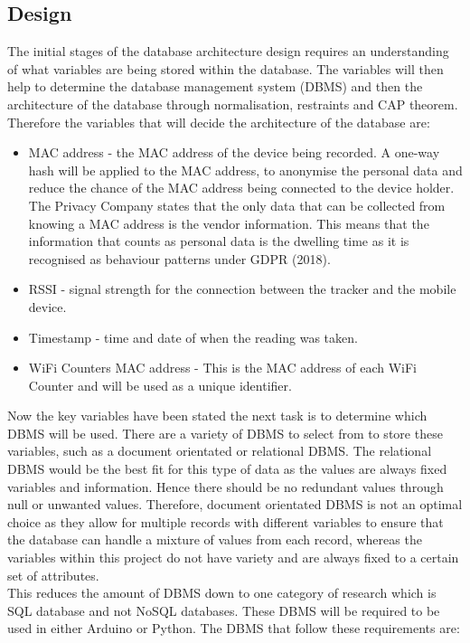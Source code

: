 \documentclass{report}
\begin{document}
\subsection{Design}
The initial stages of the database architecture design requires an understanding of what variables are being stored within the database. The variables will then help to determine the database management system (DBMS) and then the architecture of the database through normalisation, restraints and CAP theorem\cite{CAPTheorm}. Therefore the variables that will decide the architecture of the database are:
\begin{itemize}
    \item MAC address\cite{MacAddress1} - the MAC address of the device being recorded. A one-way hash will be applied to the MAC address, to anonymise the personal data and reduce the chance of the MAC address being connected to the device holder. The Privacy Company states that the only data that can be collected from knowing a MAC address is the vendor information. This means that the information that counts as personal data is the dwelling time as it is recognised as behaviour patterns under GDPR (2018)\cite{GDPR}. 
    \item RSSI\cite{RSSI} - signal strength  for the connection between the tracker and the mobile device.
    \item Timestamp - time and date of when the reading was taken. 
    \item WiFi Counters MAC address -  This is the MAC address of each WiFi Counter and will be used as a unique identifier. 
\end{itemize}
Now the key variables have been stated the next task is to determine which DBMS will be used. There are a variety of DBMS to select from to store these variables, such as a document orientated or relational DBMS. The relational DBMS would be the best fit for this type of data as the values are always fixed variables and information. Hence there should be no redundant values through null or unwanted values. Therefore, document orientated DBMS is not an optimal choice as they allow for multiple records with different variables to ensure that the database can handle a mixture of values from each record, whereas the variables within this project do not have variety and are always fixed to a certain set of attributes.\\ \newline
This reduces the amount of DBMS down to one category of research which is SQL database and not NoSQL databases\cite{SQLvNoSQL}. These DBMS will be required to be used in either Arduino or Python. The DBMS that follow these requirements are:
\end{document}
